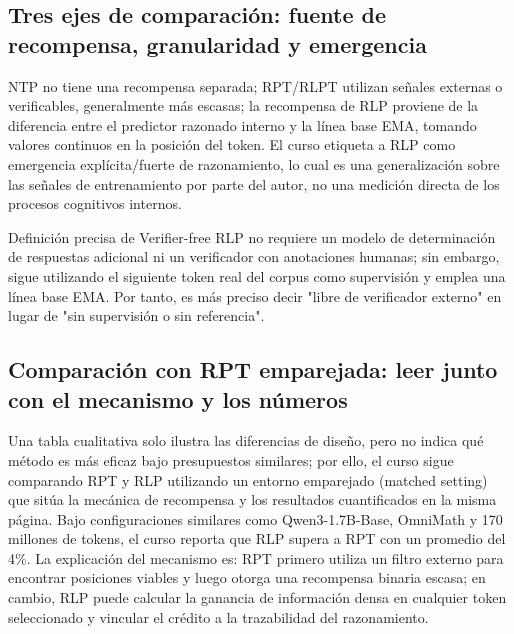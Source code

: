 \subsection{Tres ejes de comparación: fuente de recompensa, granularidad y emergencia}

NTP no tiene una recompensa separada; RPT/RLPT utilizan señales externas o verificables, generalmente más escasas; la recompensa de RLP proviene de la diferencia entre el predictor razonado interno y la línea base EMA, tomando valores continuos en la posición del token. El curso etiqueta a RLP como emergencia explícita/fuerte de razonamiento, lo cual es una generalización sobre las señales de entrenamiento por parte del autor, no una medición directa de los procesos cognitivos internos.


\begin{warningbox}{Definición precisa de Verifier-free}
RLP no requiere un modelo de determinación de respuestas adicional ni un verificador con anotaciones humanas; sin embargo, sigue utilizando el siguiente token real del corpus como supervisión y emplea una línea base EMA. Por tanto, es más preciso decir "libre de verificador externo" en lugar de "sin supervisión o sin referencia".
\end{warningbox}

\subsection{Comparación con RPT emparejada: leer junto con el mecanismo y los números}

Una tabla cualitativa solo ilustra las diferencias de diseño, pero no indica qué método es más eficaz bajo presupuestos similares; por ello, el curso sigue comparando RPT y RLP utilizando un entorno emparejado (matched setting) que sitúa la mecánica de recompensa y los resultados cuantificados en la misma página. Bajo configuraciones similares como Qwen3-1.7B-Base, OmniMath y 170 millones de tokens, el curso reporta que RLP supera a RPT con un promedio del 4\%. La explicación del mecanismo es: RPT primero utiliza un filtro externo para encontrar posiciones viables y luego otorga una recompensa binaria escasa; en cambio, RLP puede calcular la ganancia de información densa en cualquier token seleccionado y vincular el crédito a la trazabilidad del razonamiento.

